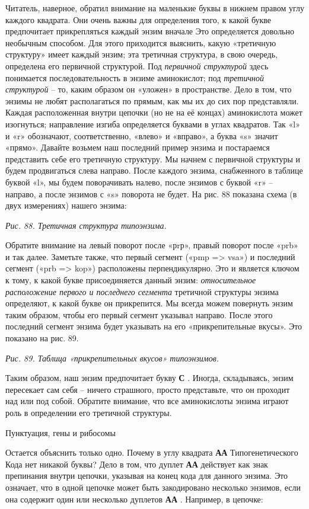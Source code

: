 \documentclass[../main.tex]{subfiles}
\begin{document}
Читатель, наверное, обратил внимание на маленькие буквы в нижнем правом углу каждого квадрата. Они очень важны для определения того, к какой букве предпочитает прикрепляться каждый энзим вначале Это определяется довольно необычным способом. Для этого приходится выяснить, какую «третичную структуру» имеет каждый энзим; эта третичная структура, в свою очередь, определена его первичной структурой. Под \emph{первичной структурой} здесь понимается последовательность в энзиме аминокислот; под \emph{третичной структурой} \--- то, каким образом он «уложен» в пространстве. Дело в том, что энзимы не любят располагаться по прямым, как мы их до сих пор представляли. Каждая расположенная внутри цепочки (но не на её концах) аминокислота может изогнуться; направление изгиба определяется буквами в углах квадратов. Так «l» и «r» обозначают, соответственно, «влево» и «вправо», а буква «s» значит «прямо». Давайте возьмем наш последний пример энзима и постараемся представить себе его третичную структуру. Мы начнем с первичной структуры и будем продвигаться слева направо. После каждого энзима, снабженного в таблице буквой «l», мы будем поворачивать налево, после энзимов с буквой «r» \--- направо, а после энзимов с «s» поворота не будет. На рис. 88 показана схема (в двух измерениях) нашего энзима:

\emph{Рис. 88. Третичная структура типоэнзима.}

Обратите внимание на левый поворот после «рrр», правый поворот после «prb» и так далее. Заметьте также, что первый сегмент («pmp =\textgreater{} vsa») и последний сегмент («prb =\textgreater{} kop») расположены перпендикулярно. Это и является ключом к тому, к какой букве присоединяется данный энзим: \emph{относительное расположение первого и последнего сегмента} третичной структуры энзима определяют, к какой букве он прикрепится. Мы всегда можем повернуть энзим таким образом, чтобы его первый сегмент указывал направо. После этого последний сегмент энзима будет указывать на его «прикрепительные вкусы». Это показано на рис. 89.

\emph{Рис. 89. Таблица «прикрепительных вкусов» типоэнзимов.}

Таким образом, наш энзим предпочитает букву \textbf{С} . Иногда, складываясь, энзим пересекает сам себя \--- ничего страшного, просто представьте, что он проходит над или под собой. Обратите внимание, что все аминокислоты энзима играют роль в определении его третичной структуры.

Пунктуация, гены и рибосомы

Остается объяснить только одно. Почему в углу квадрата \textbf{АА} Типогенетического Кода нет никакой буквы? Дело в том, что дуплет \textbf{АА} действует как знак препинания внутри цепочки, указывая на конец кода для данного энзима. Это означает, что в одной цепочке может быть закодировано несколько энзимов, если она содержит один или несколько дуплетов \textbf{АА} . Например, в цепочке:
\end{document}
